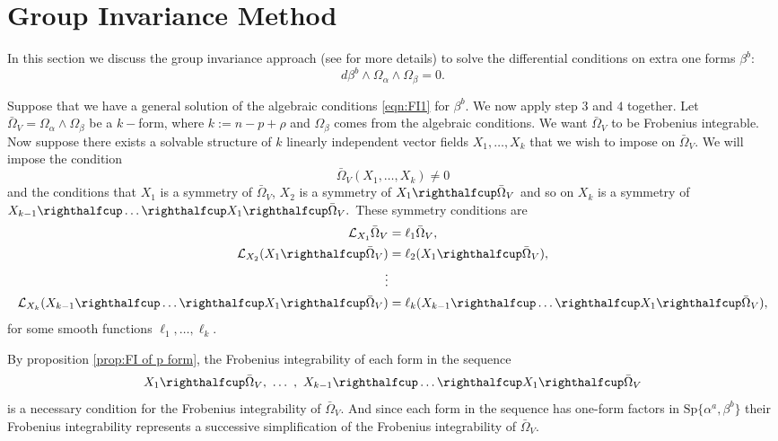 \documentclass[a4paper, 11pt]{amsart}
\theoremstyle{definition}
\begin{document}
\section{Group Invariance Method}\label{GIS}

In this section we discuss the group invariance approach (see \cite{NTGP13} for more details) to solve the differential conditions on extra one forms $\beta^b:$
\begin{equation}\label{eq:diff cond}
  d\beta^b\wedge\Omega_\alpha\wedge\Omega_\beta=0.
\end{equation}

Suppose that we have a general solution of the algebraic conditions \eqref{eqn:FI1} for $\beta^b.$ We now apply step $3$ and $4$ together. Let $\bar{\Omega}_V=\Omega_\alpha\wedge \Omega_\beta$ be a $k-$form, where $k:=n-p+\rho$ and $\Omega_\beta$ comes from the algebraic conditions.  We want $\bar{\Omega}_V$ to be Frobenius integrable. Now suppose there exists a solvable structure of $k$ linearly independent vector fields $X_1,\ldots,X_k$ that we wish to impose on $\bar{\Omega}_V.$ We will impose the condition $$\bar{\Omega}_V(X_1,\ldots,X_k)\neq 0$$ and the conditions that $X_1$ is a symmetry of $\bar{\Omega}_V$, $X_2$ is a symmetry of $X_1\righthalfcup\bar{\Omega}_V$ and so on $X_k$ is a symmetry of $X_{k-1}\righthalfcup\dots\righthalfcup X_1\righthalfcup\bar{\Omega}_V.$ These symmetry conditions are \begin{align}\label{eq:symmcond}
 \mathcal{L}_{X_1}\bar{\Omega}_V &=\ell_1\bar{\Omega}_V,\nonumber\\
 \mathcal{L}_{X_2}(X_1\righthalfcup\bar{\Omega}_V) &=\ell_2(X_1\righthalfcup\bar{\Omega}_V),\\
 \vdots\nonumber\\
 \mathcal{L}_{X_{k}}(X_{k-1}\righthalfcup\dots\righthalfcup X_1\righthalfcup\bar{\Omega}_V) &=\ell_{k}(X_{k-1}\righthalfcup\dots\righthalfcup X_1\righthalfcup\bar{\Omega}_V),\nonumber
 \end{align}
  for some smooth functions $\ell_1,\ldots,\ell_k.$
 
By proposition \ref{prop:FI of p form}, the Frobenius integrability of each form in the sequence $$X_1 \righthalfcup \bar\Omega_V,\ \dots\ ,\ X_{k-1}\righthalfcup \dots\righthalfcup  X_1\righthalfcup  \bar\Omega_V$$is a necessary condition for the Frobenius integrability of $\bar\Omega_V$. And since each form in the sequence has one-form factors in ${\text{Sp}}\{\alpha^a,\beta^b\}$ their Frobenius integrability  represents a successive simplification of the Frobenius integrability of $\bar\Omega_V$.
\end{document}

